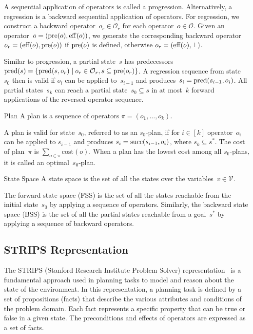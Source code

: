 A sequential application of operators is called a progression. Alternatively, a regression is a backward sequential application of operators. For regression, we construct a backward operator~$o_r \in \mathcal{O}_r$ for each operator~$o \in \mathcal{O}$. Given an operator~$o = (\operatorname{pre}(o), \operatorname{eff}(o))$, we generate the corresponding backward operator~$o_r = (\operatorname{eff}(o), \operatorname{pre}(o))$ if $\operatorname{pre}(o)$ is defined, otherwise $o_r=(\operatorname{eff}(o),\bot)$.

Similar to progression, a partial state~$s$ has predecessors $\operatorname{pred}(s)=\{\operatorname{pred}(s,o_r)\mid o_r\in \mathcal{O}_r, s \subseteq \operatorname{pre}(o_r)\}$. A regression sequence from state~$s_0$ then is valid if $o_i$ can be applied to~$s_{i-1}$ and produces~$s_i=\operatorname{pred}(s_{i-1},o_i)$. All partial states~$s_k$ can reach a partial state~$s_0 \subseteq s$ in at most~$k$ forward applications of the reversed operator sequence.

\begin{definition}{Plan}
    \label{def:plan}
    A plan is a sequence of operators $\pi=(o_1,\ldots,o_k)$.
\end{definition}

A plan is valid for state~$s_0$, referred to as an $s_0$-plan, if for $i\in[k]$ operator~$o_i$ can be applied to $s_{i-1}$ and produces $s_i=\operatorname{succ}(s_{i-1},o_i)$, where $s_k \subseteq s^*$. The cost of plan~$\pi$ is $\sum_{o\in\pi} \text{cost}(o)$. When a plan has the lowest cost among all $s_0$-plans, it is called an optimal~$s_0$-plan.

\begin{definition}{State Space}
    \label{def:statespace}
    A state space is the set of all the states over the variables~$v \in \mathcal{V}$.
\end{definition}

The forward state space (FSS) is the set of all the states reachable from the initial state~$s_0$ by applying a sequence of operators. Similarly, the backward state space (BSS) is the set of all the partial states reachable from a goal~$s^*$ by applying a sequence of backward operators.

\subsection{STRIPS Representation}
\label{sec:strips}

The STRIPS (Stanford Research Institute Problem Solver) representation~\cite{fikes1971strips} is a fundamental approach used in planning tasks to model and reason about the state of the environment. In this representation, a planning task is defined by a set of propositions (facts) that describe the various attributes and conditions of the problem domain. Each fact represents a specific property that can be true or false in a given state. The preconditions and effects of operators are expressed as a set of facts.

